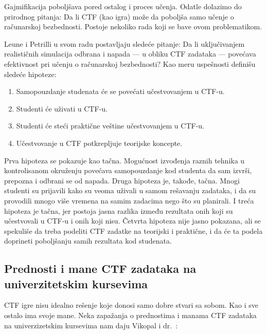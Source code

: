 \documentclass[12pt, a4paper, twocolumn]{article}
\begin{document}
Gajmifikacija poboljšava pored ostalog i proces učenja. \cite{gami1, gami2}
Odatle dolazimo do prirodnog pitanja: Da li CTF (kao igra) može da poboljša
samo učenje o računarskoj bezbednosti. Postoje nekoliko rada koji se bave
ovom problematikom.

Leune i Petrilli \cite{ctf_leune} u svom radu postavljaju sledeće pitanje:
Da li uključivanjem realističnih simulacija odbrana i napada --- u obliku
CTF zadataka --- povećava efektivnost pri učenju o računarskoj bezbednosti?
Kao meru uspešnosti definišu sledeće hipoteze:

\begin{enumerate}
    \item Samopouzdanje studenata će se povećati učestvovanjem u CTF-u.
    \item Studenti će uživati u CTF-u.
    \item Studenti će steći praktične veštine učestvovanjem u CTF-u.
    \item Učestvovanje u CTF potkrepljuje teorijske koncepte.
\end{enumerate}

Prva hipoteza se pokazuje kao tačna. Mogućnost izvođenja raznih tehnika u 
kontrolisanom okruženju povećava samopouzdanje kod studenta da sam izvrši,
prepozna i odbrani se od napada. Druga hipoteza je, takođe, tačna. Mnogi
studenti su prijavili kako su veoma uživali u samom rešavanju zadataka, i
da su provodili mnogo više vremena na samim zadacima nego što su planirali.
I treća hipoteza je tačna, jer postoja jasna razlika između rezultata
onih koji su učestvovali u CTF-u i onih koji nisu. Četvrta hipoteza nije jasno
pokazana, ali se spekuliše da treba podeliti CTF zadatke na teorijski i
praktične, i da će ta podela doprineti poboljšanju samih rezultata kod
studenata.

\subsection{Prednosti i mane CTF zadataka na univerzitetskim kursevima}

CTF igre nisu idealno rešenje koje donosi samo dobre stvari sa sobom.
Kao i sve ostalo ima svoje mane. Neka zapažanja o prednostima i manama
CTF zadataka na univerzizetskim kursevima nam daju Vikopal i dr.\ 
\cite{ctf_uni}:
\end{document}
